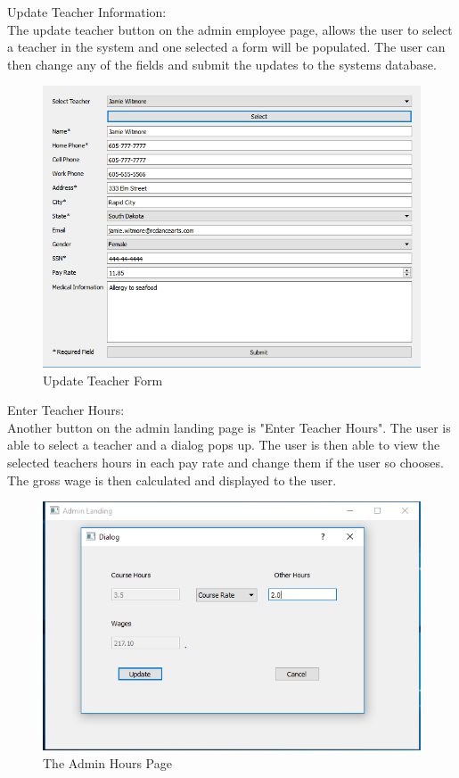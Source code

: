 Update Teacher Information:\\
The update teacher button on the admin employee page, allows the user to select a teacher in the system and one selected a form will be populated. The user can then change any of the fields and submit the updates to the systems database.\\ 

\begin{figure}
  \includegraphics[width=\linewidth]{pics/userGuide/updateTeacher.png}
  \caption{Update Teacher Form}
  \label{fig:User doc: Teacher Update}
\end{figure}

Enter Teacher Hours:\\
Another button on the admin landing page is "Enter Teacher Hours". The user is able to select a teacher and a dialog pops up. The user is then able to view the selected teachers hours in each pay rate and change them if the user so chooses. The gross wage is then calculated and displayed to the user.\\

\begin{figure}
  \includegraphics[width=\linewidth]{pics/userGuide/hours.png}
  \caption{The Admin Hours Page}
  \label{fig:User doc: Enter Hours}
\end{figure} 

